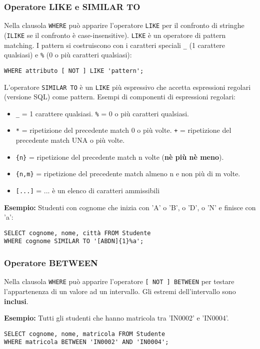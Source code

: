 \documentclass[a4paper, 10pt, titlepage]{article}
\begin{document}
	\subsubsection{Operatore LIKE e SIMILAR TO}
		Nella clausola \lstinline|WHERE| può apparire l’operatore \lstinline|LIKE| per il confronto di
		stringhe (\lstinline|ILIKE| se il confronto è case-insensitive). \lstinline|LIKE| è un operatore di pattern matching. I pattern si costruiscono con i caratteri speciali \lstinline|_| (1 carattere qualsiasi) e \lstinline|%| (0 o più caratteri qualsiasi):
		\begin{lstlisting}
WHERE attributo [ NOT ] LIKE 'pattern';
		\end{lstlisting}
		L’operatore \lstinline|SIMILAR TO| è un \lstinline|LIKE| più espressivo che accetta
		espressioni regolari (versione SQL) come pattern. Esempi di componenti di
		espressioni regolari:
		\begin{itemize}
			\item \lstinline|_| = 1 carattere qualsiasi. \lstinline|%| = 0 o più caratteri qualsiasi.
			\item \lstinline|*| = ripetizione del precedente match 0 o più volte. 
				\lstinline|+| = ripetizione del precedente match UNA o più volte.
			\item \lstinline|{n}| = ripetizione del precedente match n volte (\textbf{nè più nè meno}).
			\item \lstinline|{n,m}| = ripetizione del precedente match almeno n e non più di m volte.
			\item \lstinline|[...]| = ... è un elenco di caratteri ammissibili
		\end{itemize}
		\textbf{Esempio:} Studenti con cognome che inizia con 'A' o 'B', o 'D', o 'N' e finisce con 'a':
		\begin{lstlisting}
SELECT cognome, nome, città FROM Studente
WHERE cognome SIMILAR TO '[ABDN]{1}%a';
		\end{lstlisting}
		
	\subsubsection{Operatore BETWEEN}
		Nella clausola \lstinline|WHERE| può apparire l’operatore \lstinline|[ NOT ] BETWEEN| per testare
		l’appartenenza di un valore ad un intervallo. Gli estremi dell'intervallo sono \textbf{inclusi}.
		
		\noindent
		\textbf{Esempio:} Tutti gli studenti che hanno matricola tra 'IN0002' e 'IN0004'.
	\begin{lstlisting}
SELECT cognome, nome, matricola FROM Studente
WHERE matricola BETWEEN 'IN0002' AND 'IN0004';
	\end{lstlisting}
	
\end{document}
